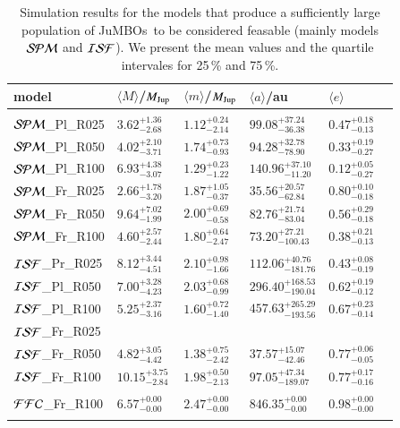 \documentclass[submission,phys]{lib/SciPost}
\newcommand{\MJup}{\mbox{${M}_{\rm Jup}$}}
\newcommand{\jumbos}{\mbox{JuMBOs}}
\begin{document}
\begin{table}
  \caption{Simulation results for the models that produce a
    sufficiently large population of \jumbos\, to be considered
    feasable (mainly models ${\cal SPM}$ and ${\cal ISF}$). We present
    the mean values and the quartile intervales for 25\,\% and 75\,\%.
  }
\label{Tab:orbital_distributions}
 \centering 
 \begin{tabular}{llllll}
 \hline\hline
model&$\langle M \rangle$/\MJup & $\langle m \rangle$/\MJup & $\langle a \rangle$/au & $\langle e \rangle$ \\
 \hline \vspace{-0.75em} \\ 
 ${\cal SPM}$\_Pl\_R025 & $3.62^{+1.36}_{-2.68}$ & $1.12^{+0.24}_{-2.14}$ & $99.08^{+37.24}_{-36.38}$ & $0.47^{+0.18}_{-0.13}$ \\
 ${\cal SPM}$\_Pl\_R050 & $4.02^{+2.10}_{-3.71}$ & $1.74^{+0.73}_{-0.93}$ & $94.28^{+32.78}_{-78.90}$ & $0.33^{+0.19}_{-0.27}$ \\  
 ${\cal SPM}$\_Pl\_R100 & $6.93^{+4.38}_{-3.07}$ & $1.29^{+0.23}_{-1.22}$ & $140.96^{+37.10}_{-11.20}$ & $0.12^{+0.05}_{-0.27}$ \\
 ${\cal SPM}$\_Fr\_R025 & $2.66^{+1.78}_{-3.20}$ & $1.87^{+1.05}_{-0.37}$ & $35.56^{+20.57}_{-62.84}$ & $0.80^{+0.10}_{-0.18}$ \\ 
 ${\cal SPM}$\_Fr\_R050 & $9.64^{+7.02}_{-1.99}$ & $2.00^{+0.69}_{-0.58}$ & $82.76^{+21.74}_{-83.04}$ & $0.56^{+0.29}_{-0.18}$ \\ 
 ${\cal SPM}$\_Fr\_R100 & $4.60^{+2.57}_{-2.44}$ & $1.80^{+0.64}_{-2.47}$ & $73.20^{+27.21}_{-100.43}$ & $0.38^{+0.21}_{-0.13}$ \\
 \hline \vspace{-0.75em} \\ 
 ${\cal ISF}$\_Pr\_R025 & $8.12^{+3.44}_{-4.51}$ & $2.10^{+0.98}_{-1.66}$ & $112.06^{+40.76}_{-181.76}$ & $0.43^{+0.08}_{-0.19}$ \\
 ${\cal ISF}$\_Pl\_R050 & $7.00^{+3.28}_{-4.23}$ & $2.03^{+0.68}_{-0.99}$ & $296.40^{+168.53}_{-190.04}$ & $0.62^{+0.19}_{-0.12}$ \\
 ${\cal ISF}$\_Pl\_R100 & $5.25^{+2.37}_{-3.16}$ & $1.60^{+0.72}_{-1.40}$ & $457.63^{+265.29}_{-193.56}$ & $0.67^{+0.23}_{-0.14}$ \\
 ${\cal ISF}$\_Fr\_R025 &\\
 ${\cal ISF}$\_Fr\_R050 & $4.82^{+3.05}_{-4.42}$ & $1.38^{+0.75}_{-2.42}$ & $37.57^{+15.07}_{-42.46}$ & $0.77^{+0.06}_{-0.05}$ \\  
 ${\cal ISF}$\_Fr\_R100 &$10.15^{+3.75}_{-2.84}$ & $1.98^{+0.50}_{-2.13}$ & $97.05^{+47.34}_{-189.07}$ & $0.77^{+0.17}_{-0.16}$ \\
 \hline \vspace{-0.75em} \\ 
 ${\cal FFC}$\_Fr\_R100 &$6.57^{+0.00}_{-0.00}$ & $2.47^{+0.00}_{-0.00}$ & $846.35^{+0.00}_{-0.00}$ & $0.98^{+0.00}_{-0.00}$ \\
 \hline \vspace{-0.75em}  \\
 \end{tabular}
\end{table}
\end{document}
